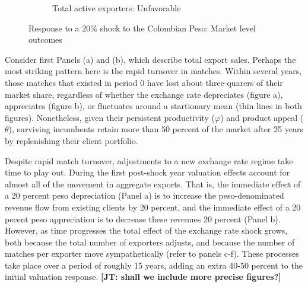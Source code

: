 \documentclass[12pt]{article}
\begin{document}
\begin{figure}[tbp]
\begin{subfigure}[b]{0.45\textwidth}
        \caption{Total active exporters: Unfavorable}
    \end{subfigure}
\caption{Response to a 20\% shock to the Colombian Peso: Market level
outcomes}
\label{fig:export_dynamics_macro}
\end{figure}





Consider first Panels (a) and (b), which describe total export sales. Perhaps the most striking pattern here is the rapid turnover in matches. Within several years, those matches that existed in period 0 have lost about three-quarers of their market share, regardless of whether the exchange rate depreciates (figure a), appreciates (figure b), or fluctuates around a startionary mean (thin lines in both figures). Nonetheless, given their persistent productivity ($\varphi$) and product appeal ($\theta$), surviving incumbents retain more than 50 percent of the market after 25 years by replenishing their client portfolio. 

Despite rapid match turnover, adjustments to a new exchange rate regime take time to play out. During the first post-shock year valuation effects account for almost all of the movement in aggregate exports. That is, the immediate effect of a 20 percent peso depreciation (Panel a) is to increase the peso-denominated revenue flow from existing clients by 20 percent, and the immediate effect of a 20 pecent peso appreciation is to decrease these revenues 20 percent (Panel b). However, as time progresses the total effect of the exchange rate shock grows, both because the total number of exporters adjusts, and because the number of matches per exporter move sympathetically (refer to panels c-f). These processes take place over a period of roughly 15 years, adding an extra 40-50 percent to the initial valuation response.  \textbf{[JT: shall we include more precise figures?]}
\end{document}
